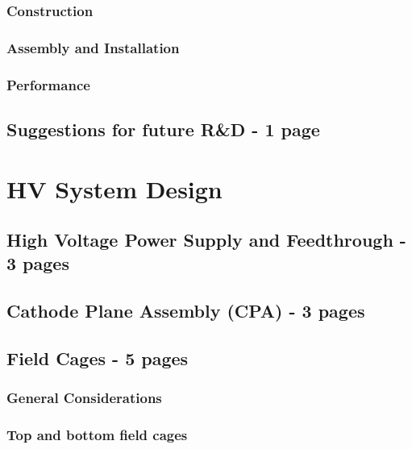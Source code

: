 \subsubsection{Construction}
\label{sec:fdsp-hv-protodune-lessons-construction}
\subsubsection{Assembly and Installation}
\label{sec:fdsp-hv-protodune-lessons-assy}
\subsubsection{Performance}
\label{sec:fdsp-hv-protodune-lessons-perf}


\subsection{Suggestions for future R\&D - 1 page}
\label{sec:fdsp-hv-protodune-RD}

\clearpage


\section{HV System Design}
\label{sec:fdsp-hv-design}

\subsection {High Voltage Power Supply and Feedthrough - 3 pages}

\subsection{Cathode Plane Assembly (CPA) - 3 pages}

\subsection{Field Cages - 5 pages}

\subsubsection{General Considerations}
\subsubsection{Top and bottom field cages}
